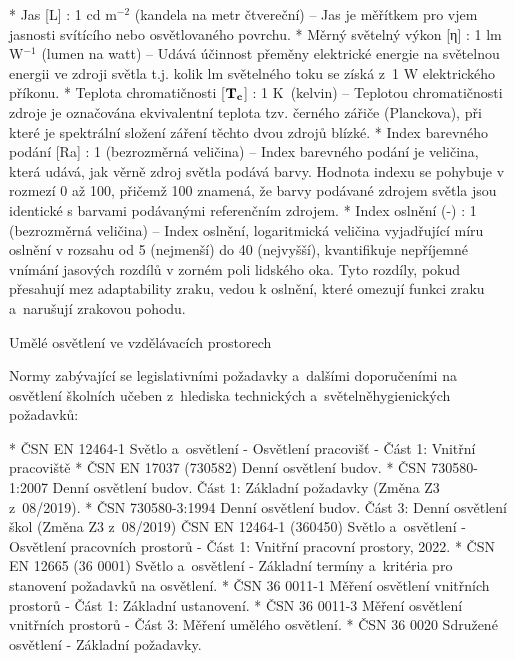 \begitems
* {\sbf Jas [L]} : 1 cd m$^{-2}$ (kandela na metr čtvereční)
    -- Jas je měřítkem pro vjem jasnosti svítícího nebo osvětlovaného povrchu.
* {\sbf Měrný světelný výkon [η]} : 1 lm W$^{-1}$ (lumen na watt) --
    Udává účinnost přeměny elektrické energie na světelnou energii ve zdroji světla
    t.j. kolik lm světelného toku se získá z~1 W elektrického příkonu.
* {\sbf Teplota chromatičnosti [$\bf{T_c}$]} : 1 K~(kelvin) -- Teplotou chromatičnosti zdroje je označována ekvivalentní
    teplota tzv. černého zářiče (Planckova), při které je spektrální složení záření těchto dvou zdrojů blízké.
* {\sbf Index barevného podání [Ra]} : 1 (bezrozměrná veličina) --
    Index barevného podání je veličina, která udává, jak věrně zdroj světla podává barvy.
    Hodnota indexu se pohybuje v rozmezí 0 až 100, přičemž 100 znamená, že barvy podávané zdrojem světla
    jsou identické s barvami podávanými referenčním zdrojem.
* {\sbf Index oslnění  (-)} : 1 (bezrozměrná veličina) --
    Index oslnění, logaritmická veličina vyjadřující míru oslnění v rozsahu
    od 5 (nejmenší) do 40 (nejvyšší), kvantifikuje nepříjemné vnímání jasových
    rozdílů v zorném poli lidského oka. Tyto rozdíly, pokud přesahují mez
    adaptability zraku, vedou k oslnění, které omezují funkci zraku a~narušují zrakovou pohodu.

\enditems

\sec Umělé osvětlení ve vzdělávacích prostorech

Normy zabývající se legislativními požadavky a~dalšími doporučeními na osvětlení školních učeben
z~hlediska technických a~světelně​ hygienických požadavků:


\begitems
* ČSN EN 12464-1 Světlo a~osvětlení - Osvětlení pracovišť - Část 1: Vnitřní pracoviště
* ČSN EN 17037 (730582) Denní osvětlení budov.
* ČSN 730580-1:2007 Denní osvětlení budov. Část 1: Základní požadavky (Změna Z3 z~08/2019).
* ČSN 730580-3:1994 Denní osvětlení budov. Část 3: Denní osvětlení škol (Změna Z3 z~08/2019)
ČSN EN 12464-1 (360450) Světlo a~osvětlení - Osvětlení pracovních prostorů - Část 1: Vnitřní pracovní prostory, 2022.
* ČSN EN 12665 (36 0001) Světlo a~osvětlení - Základní termíny a~kritéria pro stanovení požadavků na osvětlení.
* ČSN 36 0011-1 Měření osvětlení vnitřních prostorů - Část 1: Základní ustanovení.
* ČSN 36 0011-3 Měření osvětlení vnitřních prostorů - Část 3: Měření umělého osvětlení.
* ČSN 36 0020 Sdružené osvětlení - Základní požadavky.
\enditems

